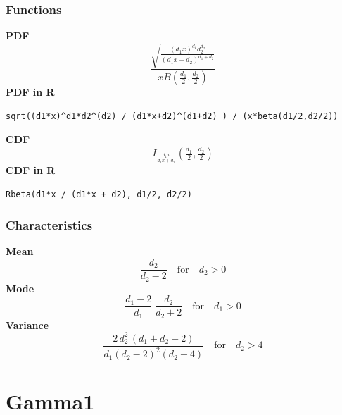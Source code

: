 \subsubsection*{Functions}

\smallskip \noindent \hspace{.2cm} \textbf{PDF} 
\begin{equation*}\frac{\sqrt{\frac{(d_1 x)^{d_1}d_2^{d_2}}
{(d_1 x+d_2)^{d_1+d_2}}}}
{x B\left(\frac{d_1}{2},\frac{d_2}{2}\right)}\end{equation*}
\smallskip \noindent \hspace{.2cm} \textbf{PDF in R}  
\begin{verbatim}sqrt((d1*x)^d1*d2^(d2) / (d1*x+d2)^(d1+d2) ) / (x*beta(d1/2,d2/2))\end{verbatim}
\smallskip \noindent \hspace{.2cm} \textbf{CDF} 
\begin{equation*}I_{\frac{d_1 x}{d_1 x + d_2}} \left(\tfrac{d_1}{2}, \tfrac{d_2}{2} \right)\end{equation*}
\smallskip \noindent \hspace{.2cm} \textbf{CDF in R} 
\begin{verbatim}Rbeta(d1*x / (d1*x + d2), d1/2, d2/2)\end{verbatim}
\smallskip
\subsubsection*{Characteristics}
\smallskip \noindent \hspace{.2cm} \textbf{Mean} 
\begin{equation*}\frac{d_2}{d_2-2} \quad \text{for} \quad d_2 > 0\end{equation*}
\smallskip \noindent \hspace{.2cm} \textbf{Mode} 
\begin{equation*}\frac{d_1-2}{d_1}\;\frac{d_2}{d_2+2} \quad \text{for} \quad d_1 > 0\end{equation*}
\smallskip \noindent \hspace{.2cm} \textbf{Variance} 
\begin{equation*}\frac{2\,d_2^2\,(d_1+d_2-2)}{d_1 (d_2-2)^2 (d_2-4)} \quad \text{for} \quad d_2 > 4\end{equation*}
\smallskip
\section*{Gamma1} 

  \bigskip 

